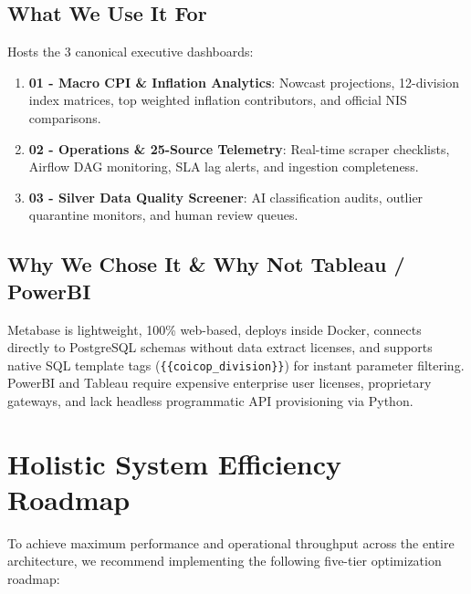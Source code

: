 \documentclass[a4paper, 11pt]{article}
\begin{document}
\subsection{What We Use It For}
Hosts the 3 canonical executive dashboards:
\begin{enumerate}[leftmargin=*]
    \item \textbf{01 - Macro CPI \& Inflation Analytics}: Nowcast projections, 12-division index matrices, top weighted inflation contributors, and official NIS comparisons.
    \item \textbf{02 - Operations \& 25-Source Telemetry}: Real-time scraper checklists, Airflow DAG monitoring, SLA lag alerts, and ingestion completeness.
    \item \textbf{03 - Silver Data Quality Screener}: AI classification audits, outlier quarantine monitors, and human review queues.
\end{enumerate}

\subsection{Why We Chose It \& Why Not Tableau / PowerBI}
Metabase is lightweight, 100\% web-based, deploys inside Docker, connects directly to PostgreSQL schemas without data extract licenses, and supports native SQL template tags (\texttt{\{\{coicop\_division\}\}}) for instant parameter filtering. PowerBI and Tableau require expensive enterprise user licenses, proprietary gateways, and lack headless programmatic API provisioning via Python.

\section{Holistic System Efficiency Roadmap}

To achieve maximum performance and operational throughput across the entire architecture, we recommend implementing the following five-tier optimization roadmap:
\end{document}

